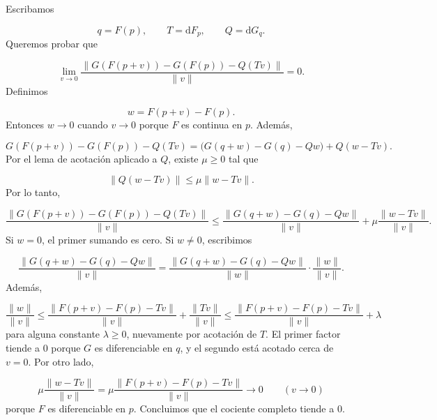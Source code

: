 \begin{bookproof}{}
Escribamos

\[
q=F(p),\qquad T=\mathrm{d} F_p,\qquad Q=\mathrm{d} G_q.
\]
Queremos probar que

\[
\lim_{v\to 0}
\frac{\|G(F(p+v))-G(F(p))-Q(Tv)\|}{\|v\|}=0.
\]
Definimos

\[
w = F(p+v)-F(p).
\]
Entonces $w\to 0$ cuando $v\to 0$ porque $F$ es continua en $p$. Además,

\[
G(F(p+v))-G(F(p))-Q(Tv)
=
\bigl(G(q+w)-G(q)-Qw\bigr)+Q(w-Tv).
\]
Por el lema de acotación aplicado a $Q$, existe $\mu\ge 0$ tal que

\[
\|Q(w-Tv)\|\le \mu \|w-Tv\|.
\]
Por lo tanto,

\[
\frac{\|G(F(p+v))-G(F(p))-Q(Tv)\|}{\|v\|}
\le
\frac{\|G(q+w)-G(q)-Qw\|}{\|v\|}
+
\mu \frac{\|w-Tv\|}{\|v\|}.
\]
Si $w=0$, el primer sumando es cero. Si $w\neq 0$, escribimos

\[
\frac{\|G(q+w)-G(q)-Qw\|}{\|v\|}
=
\frac{\|G(q+w)-G(q)-Qw\|}{\|w\|}
\cdot
\frac{\|w\|}{\|v\|}.
\]
Además,

\[
\frac{\|w\|}{\|v\|}
\le
\frac{\|F(p+v)-F(p)-Tv\|}{\|v\|}
+
\frac{\|Tv\|}{\|v\|}
\le
\frac{\|F(p+v)-F(p)-Tv\|}{\|v\|}+\lambda
\]
para alguna constante $\lambda\ge 0$, nuevamente por acotación de $T$. El primer factor tiende a $0$ porque $G$ es diferenciable en $q$, y el segundo está acotado cerca de $v=0$. Por otro lado,

\[
\mu \frac{\|w-Tv\|}{\|v\|}
=
\mu \frac{\|F(p+v)-F(p)-Tv\|}{\|v\|}
\longrightarrow 0
\qquad (v\to 0)
\]
porque $F$ es diferenciable en $p$. Concluimos que el cociente completo tiende a $0$.

\bookqed
\end{bookproof}
